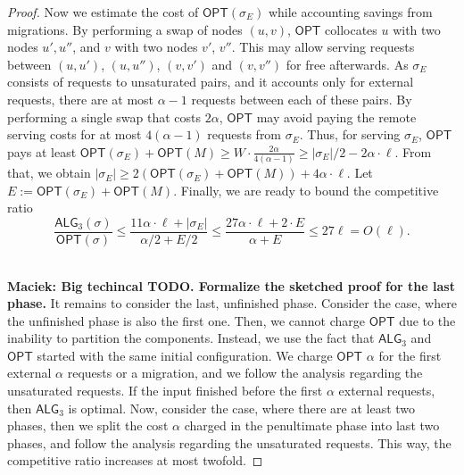 \documentclass[manuscript,screen=true, review, anonymous]{acmart}
\newcommand{\OPT}{\textsf{OPT}\xspace}
\newcommand{\TAlg}{{\ensuremath{\textsf{ALG}_{3}}}\xspace} %
\newcommand\maciek[1]{\color{brown}\textbf{\\ Maciek: #1}\color{black}}
\begin{document}
\begin{proof}
  Now we estimate the cost of $\OPT(\sigma_E)$ while accounting savings from migrations.
  By performing a swap of nodes $(u,v)$, $\OPT$ collocates $u$ with two nodes $u', u''$, and $v$ with two nodes $v'$, $v''$.
  This may allow serving requests between $(u,u')$, $(u,u'')$, $(v,v')$ and $(v,v'')$ for free afterwards.
  As $\sigma_E$ consists of requests to unsaturated pairs, and it accounts only for external requests, there are at most $\alpha-1$ requests between each of these pairs.
  By performing a single swap that costs $2\alpha$, $\OPT$ may avoid paying the remote serving costs for at most $4 (\alpha - 1)$ requests from $\sigma_E$.
  Thus, for serving $\sigma_E$, $\OPT$ pays at least $\OPT(\sigma_E) + \OPT(M) \geq W \cdot \frac{2\alpha}{4 (\alpha-1)}\geq |\sigma_E| / 2 - 2 \alpha \cdot \ell$.
  From that, we obtain $|\sigma_E| \geq 2(\OPT(\sigma_E)+\OPT(M)) + 4\alpha \cdot \ell$.
  Let $E := \OPT(\sigma_E) + \OPT(M)$. Finally, we are ready to bound the competitive ratio
  \begin{equation*}
    \frac{\TAlg(\sigma)}{\OPT(\sigma)} \leq \frac{11\alpha \cdot \ell + |\sigma_E|}{\alpha/2 + E/2} \leq \frac{27\alpha\cdot\ell + 2\cdot E}{\alpha + E} \leq 27 \ell = O(\ell).
  \end{equation*}

  \medskip

  \maciek{Big techincal TODO. Formalize the sketched proof for the last phase.}
  It remains to consider the last, unfinished phase.
  Consider the case, where the unfinished phase is also the first one.
  Then, we cannot charge $\OPT$ due to the inability to partition the components.
  Instead, we use the fact that \TAlg and $\OPT$ started with the same initial configuration.
  We charge $\OPT$ $\alpha$ for the first external $\alpha$ requests or a migration,
  and we follow the analysis regarding the unsaturated requests.
  If the input finished before the first $\alpha$ external requests, then \TAlg is optimal.
  Now, consider the case, where there are at least two phases, then we split the cost $\alpha$ charged in the penultimate phase into last two phases, and follow the analysis regarding the unsaturated requests.
  This way, the competitive ratio increases at most twofold.
\end{proof}



  

\pagebreak
\appendix
\end{document}
